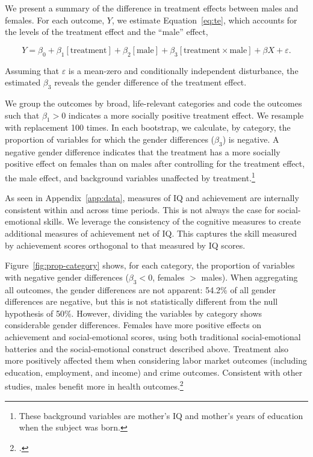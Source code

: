 We present a summary of the difference in treatment effects between males and females. For each outcome, $Y$, we estimate  Equation~\eqref{eq:te}, which accounts for the levels of the treatment effect and the ``male'' effect,

\begin{equation}
\label{eq:te}
Y = \beta_0 + \beta_1 [\text{treatment}] + \beta_2 [\text{male}] + \beta_3 [\text{treatment} \times \text{male}] + \beta X + \varepsilon.
\end{equation}

\noindent Assuming that $\varepsilon$ is a mean-zero and conditionally independent disturbance, the estimated $\beta_3$ reveals the gender difference of the treatment effect.

We group the outcomes by broad, life-relevant categories and code the outcomes such that $\beta_1 > 0$ indicates a more socially positive treatment effect. We resample with replacement 100 times. In each bootstrap, we calculate, by category, the proportion of variables for which the gender differences ($\beta_3$) is negative. A negative gender difference indicates that the treatment has a more socially positive effect on females than on males after controlling for the treatment effect, the male effect, and background variables unaffected by treatment.\footnote{These background variables are mother's IQ and mother's years of education when the subject was born.}

As seen in Appendix~\ref{app:data}, measures of IQ and achievement are internally consistent within and across time periods. This is not always the case for social-emotional skills. We leverage the consistency of the cognitive measures to create additional measures of achievement net of IQ. This captures the skill measured by achievement scores orthogonal to that measured by IQ scores.

Figure~\ref{fig:prop-category} shows, for each category, the proportion of variables with negative gender differences ($\beta_3 < 0$, females $>$ males). When aggregating all outcomes, the gender differences are not apparent: 54.2\% of all gender differences are negative, but this is not statistically different from the null hypothesis of 50\%. However, dividing the variables by category shows considerable gender differences. Females have more positive effects on achievement and social-emotional scores, using both traditional social-emotional batteries and the social-emotional construct described above. Treatment also more positively affected them when considering labor market outcomes (including education, employment, and income) and crime outcomes. Consistent with other studies, males benefit more in health outcomes.\footnote{\citet{Campbell_Conti_etal_2014_EarlyChildhoodInvestments,Conti_etal_2016_LongTermHealth}.}

